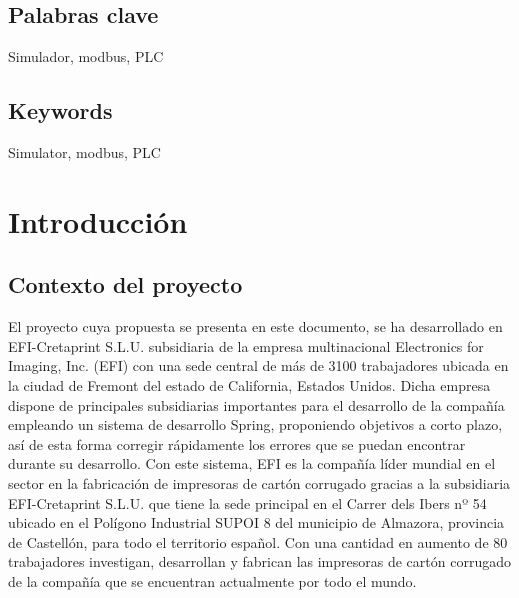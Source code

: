 \documentclass[pdftex,11pt,a4paper]{book}
\begin{document}
\section*{Palabras clave}

Simulador, modbus, PLC

\section*{Keywords}

Simulator, modbus, PLC

\thispagestyle{empty} %

\cleardoublepage




\pagestyle{plain} %

\tableofcontents

\cleardoublepage


\chapter{Introducción}

\section{Contexto del proyecto}

El proyecto cuya propuesta se presenta en este documento, se ha desarrollado en EFI-Cretaprint S.L.U. subsidiaria de la empresa multinacional Electronics for Imaging, Inc. (EFI) con una sede central de más de 3100 trabajadores ubicada en la ciudad de Fremont del estado de California, Estados Unidos. Dicha empresa dispone de principales subsidiarias importantes para el desarrollo de la compañía empleando un sistema de desarrollo Spring, proponiendo objetivos a corto plazo, así de esta forma corregir rápidamente los errores que se puedan encontrar durante su desarrollo. Con este sistema, EFI es la compañía líder mundial en el sector en la fabricación de impresoras de cartón corrugado gracias a la subsidiaria EFI-Cretaprint S.L.U. que tiene la sede principal en el Carrer dels Ibers nº 54 ubicado en el Polígono Industrial SUPOI 8 del municipio de Almazora, provincia de Castellón, para todo el territorio español. Con una cantidad en aumento de 80 trabajadores investigan, desarrollan y fabrican las impresoras de cartón corrugado de la compañía que se encuentran actualmente por todo el mundo.
\end{document}
